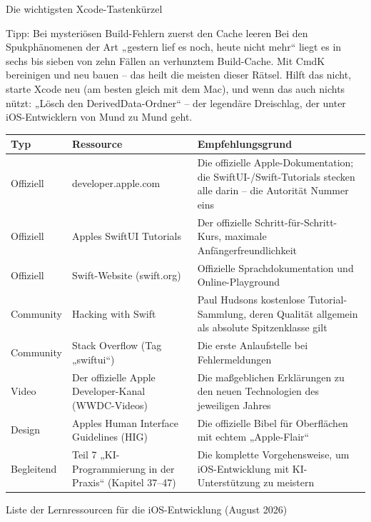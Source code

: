 \begin{center}\small\color{gray}Die wichtigsten Xcode-Tastenkürzel\end{center}

\begin{tcbinfo}{Tipp: Bei mysteriösen Build-Fehlern zuerst den Cache leeren}
Bei den Spukphänomenen der Art „gestern lief es noch, heute nicht mehr“ liegt es in sechs bis sieben von zehn Fällen an verhunztem Build-Cache. Mit CmdK bereinigen und neu bauen – das heilt die meisten dieser Rätsel. Hilft das nicht, starte Xcode neu (am besten gleich mit dem Mac), und wenn das auch nichts nützt: „Lösch den DerivedData-Ordner“ – der legendäre Dreischlag, der unter iOS-Entwicklern von Mund zu Mund geht.

\end{tcbinfo}



\begin{center}
\begin{tabularx}{\linewidth}{|X|X|X|}
\hline
\textbf{Typ} & \textbf{Ressource} & \textbf{Empfehlungsgrund} \tabularnewline
\hline
Offiziell & developer.apple.com & Die offizielle Apple-Dokumentation; die SwiftUI-/Swift-Tutorials stecken alle darin – die Autorität Nummer eins \tabularnewline
Offiziell & Apples SwiftUI Tutorials & Der offizielle Schritt-für-Schritt-Kurs, maximale Anfängerfreundlichkeit \tabularnewline
Offiziell & Swift-Website (swift.org) & Offizielle Sprachdokumentation und Online-Playground \tabularnewline
Community & Hacking with Swift & Paul Hudsons kostenlose Tutorial-Sammlung, deren Qualität allgemein als absolute Spitzenklasse gilt \tabularnewline
Community & Stack Overflow (Tag „swiftui“) & Die erste Anlaufstelle bei Fehlermeldungen \tabularnewline
Video & Der offizielle Apple Developer-Kanal (WWDC-Videos) & Die maßgeblichen Erklärungen zu den neuen Technologien des jeweiligen Jahres \tabularnewline
Design & Apples Human Interface Guidelines (HIG) & Die offizielle Bibel für Oberflächen mit echtem „Apple-Flair“ \tabularnewline
Begleitend & Teil 7 „KI-Programmierung in der Praxis“ (Kapitel 37–47) & Die komplette Vorgehensweise, um iOS-Entwicklung mit KI-Unterstützung zu meistern \tabularnewline
\hline
\end{tabularx}
\end{center}

\begin{center}\small\color{gray}Liste der Lernressourcen für die iOS-Entwicklung (August 2026)\end{center}

